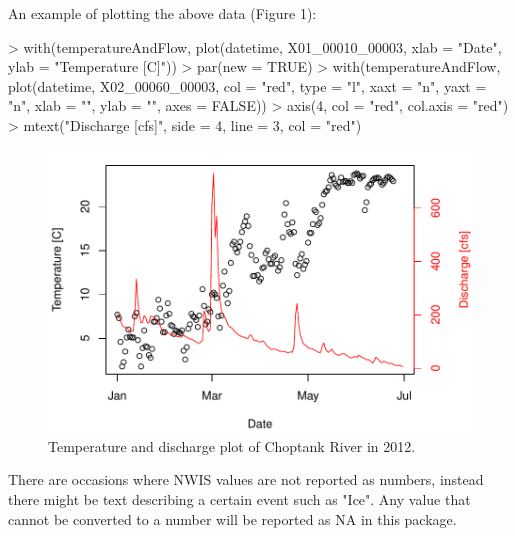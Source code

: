 \documentclass[a4paper,11pt]{article}
\begin{document}
An example of plotting the above data (Figure 1):

\begin{Schunk}
\begin{Sinput}
> with(temperatureAndFlow, plot(datetime, X01_00010_00003, xlab = "Date", 
     ylab = "Temperature [C]"))
> par(new = TRUE)
> with(temperatureAndFlow, plot(datetime, X02_00060_00003, col = "red", 
     type = "l", xaxt = "n", yaxt = "n", xlab = "", ylab = "", 
     axes = FALSE))
> axis(4, col = "red", col.axis = "red")
> mtext("Discharge [cfs]", side = 4, line = 3, col = "red")
\end{Sinput}
\end{Schunk}
\newpage

\begin{figure}
\begin{center}
\includegraphics{dataRetrieval-fig1}
\end{center}
\caption{Temperature and discharge plot of Choptank River in 2012.}
\end{figure}


There are occasions where NWIS values are not reported as numbers, instead there might be text describing a certain event such as "Ice".  Any value that cannot be converted to a number will be reported as NA in this package.




\end{document}
